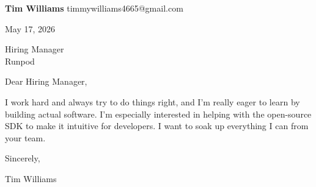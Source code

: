 \documentclass[12pt]{article}
\begin{document}
\textbf{Tim Williams} \hfill timmywilliams4665@gmail.com

\vspace{1em}

May 17, 2026

\vspace{1em}

Hiring Manager \\
Runpod

\vspace{1em}

Dear Hiring Manager,

I work hard and always try to do things right, and I'm really eager to learn by building actual software. I'm especially interested in helping with the open-source SDK to make it intuitive for developers. I want to soak up everything I can from your team.

\vspace{1em}

Sincerely,

\vspace{2em}

Tim Williams
\end{document}
